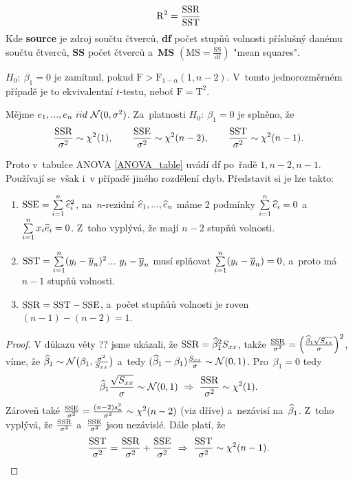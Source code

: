 $$\mathrm{R}^2=\frac{\mathrm{SSR}}{\mathrm{SST}}$$
Kde \textbf{source} je zdroj součtu čtverců, \textbf{df} počet stupňů volnosti příslušný danému součtu čtverců, \textbf{SS} počet čtverců a~\textbf{MS} $(\mathrm{MS}=\frac{\mathrm{SS}}{\mathrm{df}})$ "mean squares". 
\begin{remark}
	$H_0:~\beta_1=0$ je zamítnul, pokud $\mathrm{F}>\mathrm{F}_{1-\alpha}(1,n-2)$. V~tomto jednorozměrném případě je to ekvivalentní $t$-testu, neboť $\mathrm{F}=\mathrm{T}^2$.
\end{remark} 
\begin{theorem}
	Mějme $e_1,...,e_n~iid~\mathcal{N}(0,\sigma^2)$. Za~platnosti $H_0:~\beta_1=0$ je splněno, že
	$$ \frac{\mathrm{SSR}}{\sigma^2}\sim\chi^2(1),\qquad\frac{\mathrm{SSE}}{\sigma^2}\sim\chi^2(n-2),\qquad\frac{\mathrm{SST}}{\sigma^2}\sim\chi^2(n-1). $$
\end{theorem}
\begin{remark}
	Proto v~tabulce ANOVA \ref{ANOVA_table} uvádí df po~řadě $1,n-2,n-1$. Používají se~však i~v případě jiného rozdělení chyb. Představit si je lze takto:\begin{enumerate}
		\item $\mathrm{SSE}=\sum\limits_{i=1}^{n}\widehat{e}_i^2$, na~$n$-rezidní $\widehat{e}_1,...,\widehat{e}_n$ máme 2 podmínky $\sum\limits_{i=1}^{n}\widehat{e}_i=0$ a~$\sum\limits_{i=1}^{n} x_i\widehat{e}_i=0$. Z~toho vyplývá, že mají $n-2$ stupňů volnosti.
		\item $\mathrm{SST}=\sum\limits_{i=1}^{n}(y_i-\overline{y}_n)^2$... $y_i-\overline{y}_n$ musí splňovat $\sum\limits_{i=1}^{n}(y_i-\overline{y}_n)=0$, a~proto má $n-1$ stupňů volnosti.
		\item $\mathrm{SSR}=\mathrm{SST}-\mathrm{SSE}$, a~počet stupňůů volnosti je roven $(n-1)-(n-2)=1$.
	\end{enumerate} 
\begin{proof}
	V důkazu věty ?? jsme ukázali, že $\mathrm{SSR}=\widehat{\beta}_1^2 S_{xx}$, takže $\frac{\mathrm{SSR}}{\sigma^2}=\Big( \frac{\widehat{\beta}_1\sqrt{S_{xx}}}{\sigma} \Big)^2$, víme, že $\widehat{\beta}_1\sim\mathcal{N}\big(\beta_1,\frac{\sigma^2}{S_{xx}}\big)$ a~tedy $(\widehat{\beta}_1-\beta_1)\frac{S_{xx}}{\sigma}\sim\mathcal{N}(0,1)$. Pro~$\beta_1=0$ tedy $$\widehat{\beta}_1\frac{\sqrt{S_{xx}}}{\sigma}\sim\mathcal{N}(0,1)~\Rightarrow~\frac{\mathrm{SSR}}{\sigma^2}\sim\chi^2(1).$$
	Zároveň také $\frac{\mathrm{SSE}}{\sigma^2}=\frac{(n-2)s_n^2}{\sigma^2}\sim\chi^2(n-2)$ (viz dříve) a~nezávisí na~$\widehat{\beta}_1$. Z~toho vyplývá, že $\frac{\mathrm{SSR}}{\sigma^2}$ a~$\frac{\mathrm{SSE}}{\sigma^2}$ jsou nezávislé. Dále platí, že 
	$$ \frac{\mathrm{SST}}{\sigma^2}=\frac{\mathrm{SSR}}{\sigma^2}+\frac{\mathrm{SSE}}{\sigma^2}~\Rightarrow~\frac{\mathrm{SST}}{\sigma^2}\sim\chi^2(n-1).$$
\end{proof}
\end{remark}
